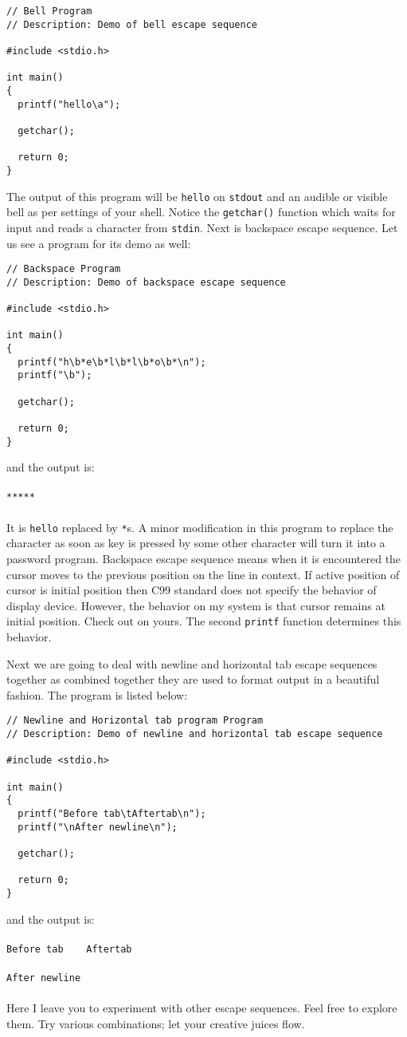\begin{verbatim}
// Bell Program
// Description: Demo of bell escape sequence

#include <stdio.h>

int main()
{
  printf("hello\a");

  getchar();

  return 0;
}
\end{verbatim}

The output of this program will be \texttt{hello} on \texttt{stdout} and an
audible or visible bell as per settings of your shell. Notice the
\texttt{getchar()} function which waits for input and reads a character from
\texttt{stdin}. Next is backspace escape sequence. Let us see a program for its
demo as well:

\begin{verbatim}
// Backspace Program
// Description: Demo of backspace escape sequence

#include <stdio.h>

int main()
{
  printf("h\b*e\b*l\b*l\b*o\b*\n");
  printf("\b");

  getchar();

  return 0;
}
\end{verbatim}

and the output is:
\\\\\texttt{*****}\\\\
It is \texttt{hello} replaced by \texttt{*}s. A minor modification in this
program to replace the character as soon as key is pressed by some other
character will turn it into a password program. Backspace escape sequence means
when it is encountered the cursor moves to the previous position on the line in
context. If active position of cursor is initial position then C99 standard
does not specify the behavior of display device. However, the behavior on my
system is that cursor remains at initial position. Check out on yours. The
second \texttt{printf} function determines this behavior.

Next we are going to deal with newline and horizontal tab escape sequences
together as combined together they are used to format output in a beautiful
fashion. The program is listed below:

\begin{verbatim}
// Newline and Horizontal tab program Program
// Description: Demo of newline and horizontal tab escape sequence

#include <stdio.h>

int main()
{
  printf("Before tab\tAftertab\n");
  printf("\nAfter newline\n");

  getchar();

  return 0;
}
\end{verbatim}

and the output is:
\\\\\texttt{Before tab~~~~Aftertab}\\\\
\texttt{After newline}\\\\
Here I leave you to experiment with other escape sequences. Feel free to
explore them. Try various combinations; let your creative juices flow.
